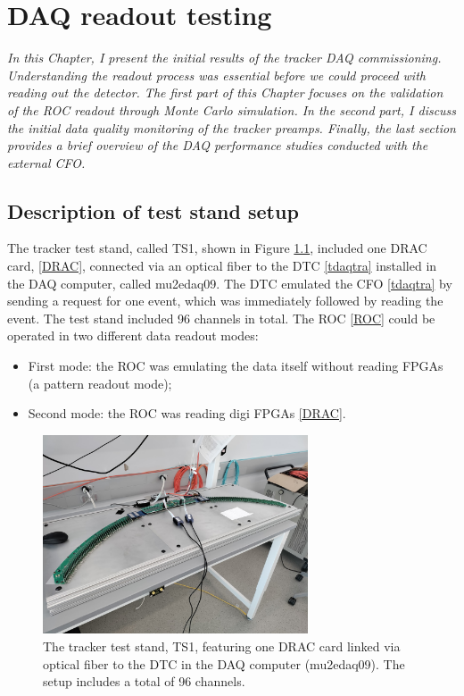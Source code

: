 \chapter{DAQ readout testing}
\textit{In this Chapter, I present the initial results of the tracker DAQ commissioning. 
Understanding the readout process was essential before we could proceed with reading out the detector. 
The first part of this Chapter focuses on the validation of the ROC readout through Monte Carlo simulation. 
In the second part, I discuss the initial data quality monitoring of the tracker preamps. 
Finally, the last section provides a brief overview of the DAQ performance studies conducted with the external CFO.
}

  \section{Description of test stand setup}\label{des}
    The tracker test stand, called TS1, shown in Figure \ref{fig:TS1}, included one DRAC card, \ref{DRAC}, connected via an optical fiber
    to the DTC \ref{tdaqtra} installed in the DAQ computer, called mu2edaq09. The DTC 
    emulated the CFO \ref{tdaqtra} by sending a request for one event, which was immediately followed by reading the event.
    The test stand included 96 channels in total.
    The ROC \ref{ROC} could be operated in two different data readout modes:
    \begin{itemize}
    \item  First mode: the ROC was emulating the data itself without reading FPGAs (a pattern readout mode);
    \item  Second mode: the ROC was reading digi FPGAs \ref{DRAC}.
    \end{itemize}
    \begin{figure}[!h]
        \centering
        \includegraphics[width =0.7\textwidth]{figures/jpg/IMG_20240219_090538.jpg}
        \caption{The tracker test stand, TS1, featuring one DRAC card linked via optical fiber to the DTC in the DAQ computer (mu2edaq09). The setup includes a total of 96 channels.}
        \label{fig:TS1}
        \end{figure}
